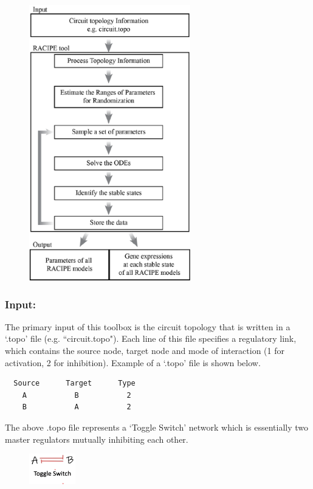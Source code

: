 \documentclass{article}
\begin{document}
\begin{figure}[H]
  \centering
  \includegraphics[width=70mm, scale=0.5]{racipe_workflow.png} \\
\end{figure}

\subsubsection*{Input:} The primary input of this toolbox is the circuit
topology that is written in a `.topo' file (e.g. ``circuit.topo"). Each line 
of this file specifies a regulatory link, which contains the source node, 
target node and mode of interaction (1 for activation, 2 for inhibition).
Example of a `.topo' file is shown below.
\begin{verbatim}
  Source      Target      Type 
    A           B           2
    B           A           2
\end{verbatim}
The above .topo file represents a `Toggle Switch' network which is essentially
two master regulators mutually inhibiting each other.
\begin{figure}[H]
  \centering
  \includegraphics[width=20mm, scale=0.5]{toggle_switch_logo.png}
\end{figure}
\end{document}
